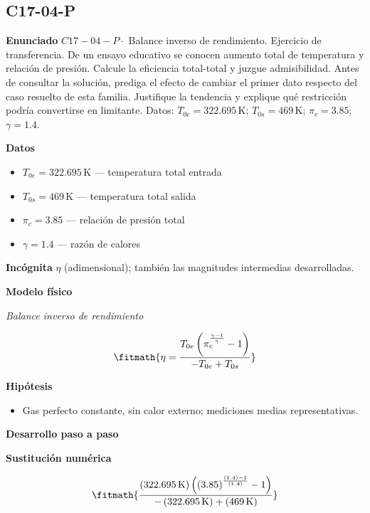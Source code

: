 \documentclass[10pt,openany]{book}
\begin{document}
\subsection*{C17-04-P}

\noindent\textbf{Enunciado}
\(C17-04-P \cdot\) Balance inverso de rendimiento. Ejercicio de transferencia. De un ensayo educativo se conocen aumento total de temperatura y relación de presión. Calcule la eficiencia total-total y juzgue admisibilidad. Antes de consultar la solución, prediga el efecto de cambiar el primer dato respecto del caso resuelto de esta familia. Justifique la tendencia y explique qué restricción podría convertirse en limitante. Datos: \(T_{0e}=322.695\, \mathrm{K}\); \(T_{0s}=469\, \mathrm{K}\); \(\pi_c=3.85\); \(\gamma=1.4\).

\noindent\textbf{Datos}
\begin{itemize}
\item $T_{0e} = 322.695\,\mathrm{K}$ — temperatura total entrada
\item $T_{0s} = 469\,\mathrm{K}$ — temperatura total salida
\item $\pi_c = 3.85$ — relación de presión total
\item $\gamma = 1.4$ — razón de calores
\end{itemize}

\noindent\textbf{Incógnita}
$\eta$ (adimensional); también las magnitudes intermedias desarrolladas.

\noindent\textbf{Modelo físico}

\noindent\textit{Balance inverso de rendimiento}

\[
\fitmath{\eta=\frac{T_{0e} \left(\pi_c^{\frac{\gamma - 1}{\gamma}} - 1\right)}{- T_{0e} + T_{0s}}}
\]

\noindent\textbf{Hipótesis}
\begin{itemize}
\item Gas perfecto constante, sin calor externo; mediciones medias representativas.
\end{itemize}

\noindent\textbf{Desarrollo paso a paso}



\noindent\textbf{Sustitución numérica}

\[
\fitmath{\frac{\left(322.695\,\mathrm{K}\right) \left(\left(3.85\right)^{\frac{\left(1.4\right) - 1}{\left(1.4\right)}} - 1\right)}{- \left(322.695\,\mathrm{K}\right) + \left(469\,\mathrm{K}\right)}}
\]
\end{document}
